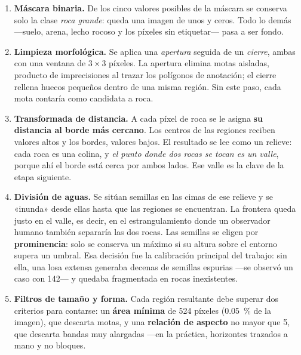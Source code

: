 \documentclass[11pt]{article}
\begin{document}
\begin{enumerate}[leftmargin=1.8em]

\item \textbf{Máscara binaria.} De los cinco valores posibles de la máscara se conserva
  solo la clase \textit{roca grande}: queda una imagen de unos y ceros. Todo lo demás
  —suelo, arena, lecho rocoso y los píxeles sin etiquetar— pasa a ser fondo.

\item \textbf{Limpieza morfológica.} Se aplica una \emph{apertura} seguida de un
  \emph{cierre}, ambas con una ventana de $3\times3$ píxeles. La apertura elimina motas
  aisladas, producto de imprecisiones al trazar los polígonos de anotación; el cierre
  rellena huecos pequeños dentro de una misma región. Sin este paso, cada mota contaría
  como candidata a roca.

\item \textbf{Transformada de distancia.} A cada píxel de roca se le asigna
  \textbf{su distancia al borde más cercano}. Los centros de las regiones reciben valores
  altos y los bordes, valores bajos. El resultado se lee como un relieve: cada roca es una
  colina, y \emph{el punto donde dos rocas se tocan es un valle}, porque ahí el borde está
  cerca por ambos lados. Ese valle es la clave de la etapa siguiente.

\item \textbf{División de aguas.} Se sitúan semillas en las cimas de ese relieve y se
  «inunda» desde ellas hasta que las regiones se encuentran. La frontera queda justo en el
  valle, es decir, en el estrangulamiento donde un observador humano también separaría las
  dos rocas. Las semillas se eligen por \textbf{prominencia}: solo se conserva un máximo si
  su altura sobre el entorno supera un umbral. Esa decisión fue la calibración principal
  del trabajo: sin ella, una losa extensa generaba decenas de semillas espurias —se
  observó un caso con \num{142}— y quedaba fragmentada en rocas inexistentes.

\item \textbf{Filtros de tamaño y forma.} Cada región resultante debe superar dos
  criterios para contarse: un \textbf{área mínima} de \num{524} píxeles
  (\SI{0.05}{\percent} de la imagen), que descarta motas, y una \textbf{relación de
  aspecto} no mayor que 5, que descarta bandas muy alargadas —en la práctica, horizontes
  trazados a mano y no bloques.

\end{enumerate}
\end{document}
